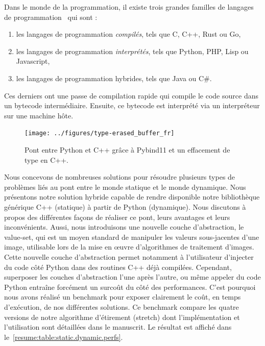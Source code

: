 Dans le monde de la programmation, il existe trois grandes familles de langages de
programmation~\parencite{prechelt.2000.comparison} qui sont :
\begin{enumerate}
  \item les langages de programmation \emph{compilés}, tels que C, C++, Rust ou Go,
  \item les langages de programmation \emph{interprétés}, tels que Python, PHP, Lisp ou Javascript,
  \item les langages de programmation hybrides, tels que Java ou C\#.
\end{enumerate}
Ces derniers ont une passe de compilation rapide qui compile le code source dans un bytecode intermédiaire. Ensuite, ce
bytecode est interprété via un interpréteur sur une machine hôte.

\begin{figure}[htbp]
  \centering
  \texttt{[image: ../figures/type-erased\_buffer\_fr]}
  \caption[]{Pont entre Python et C++ grâce à Pybind11 et un effacement de type en C++.}
  \label{resume:fig:type-erased.buffer}
\end{figure}

Nous concevons de nombreuses solutions pour résoudre plusieurs types de problèmes liés au pont entre le monde statique
et le monde dynamique. Nous présentons notre solution hybride capable de rendre disponible notre bibliothèque générique
C++ (statique) à partir de Python (dynamique). Nous discutons à propos des différentes façons de réaliser ce pont, leurs
avantages et leurs inconvénients. Aussi, nous introduisons une nouvelle couche d'abstraction, le value-set, qui est un
moyen standard de manipuler les valeurs sous-jacentes d'une image, utilisable lors de la mise en \oe{}uvre d'algorithmes
de traitement d'images. Cette nouvelle couche d'abstraction permet notamment à l'utilisateur d'injecter du code côté
Python dans des routines C++ déjà compilées. Cependant, superposer les couches d'abstraction l'une après l'autre, ou
même appeler du code Python entraîne forcément un surcoût du côté des performances. C'est pourquoi nous avons réalisé un
benchmark pour exposer clairement le coût, en temps d'exécution, de nos différentes solutions. Ce benchmark compare les
quatre versions de notre algorithme d'étirement (stretch) dont l'implémentation et l'utilisation sont détaillées dans le
manuscrit. Le résultat est affiché dans le~\cref{resume:table:static.dynamic.perfs}.

